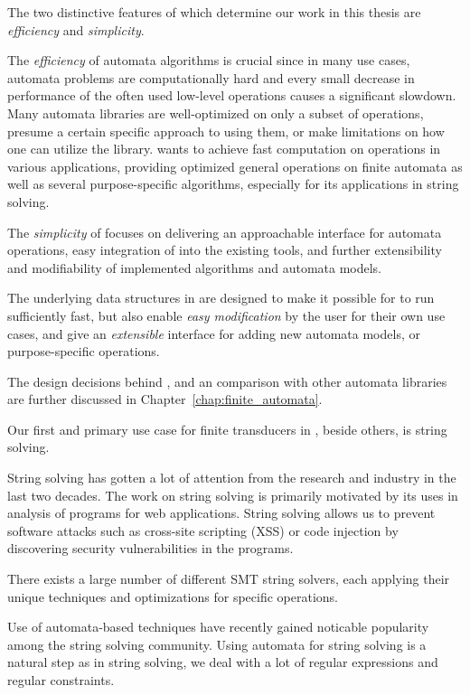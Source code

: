 The two distinctive features of \mata which determine our work in this thesis are \emph{efficiency} and \emph{simplicity}.

The \emph{efficiency} of automata algorithms is crucial since in many use cases, automata problems are computationally hard and every small decrease in performance of the often used low-level operations causes a significant slowdown.
Many automata libraries are well-optimized on only a subset of operations, presume a certain specific approach to using them, or make limitations on how one can utilize the library.
\mata wants to achieve fast computation on operations in various applications, providing optimized general operations on finite automata as well as several purpose-specific algorithms, especially for its applications in string solving.

The \emph{simplicity} of \mata focuses on delivering an approachable interface for automata operations, easy integration of \mata into the existing tools, and further extensibility and modifiability of implemented algorithms and automata models.

The underlying data structures in \mata are designed to make it possible for \mata to run sufficiently fast, but also enable \emph{easy modification} by the user for their own use cases, and give an \emph{extensible} interface for adding new automata models, or purpose-specific operations.

The design decisions behind \mata, and an comparison with other automata libraries are further discussed in Chapter~\ref{chap:finite_automata}.

Our first and primary use case for finite transducers in \mata, beside others, is string solving.

String solving has gotten a lot of attention from the research and industry in the last two decades.
The work on string solving is primarily motivated by its uses in analysis of programs for web applications.
String solving allows us to prevent software attacks such as cross-site scripting (XSS) or code injection by discovering security vulnerabilities in the programs.

There exists a large number of different SMT string solvers, each applying their unique techniques and optimizations for specific operations.

Use of automata-based techniques have recently gained noticable popularity among the string solving community.
Using automata for string solving is a natural step as in string solving, we deal with a lot of regular expressions and regular constraints.

